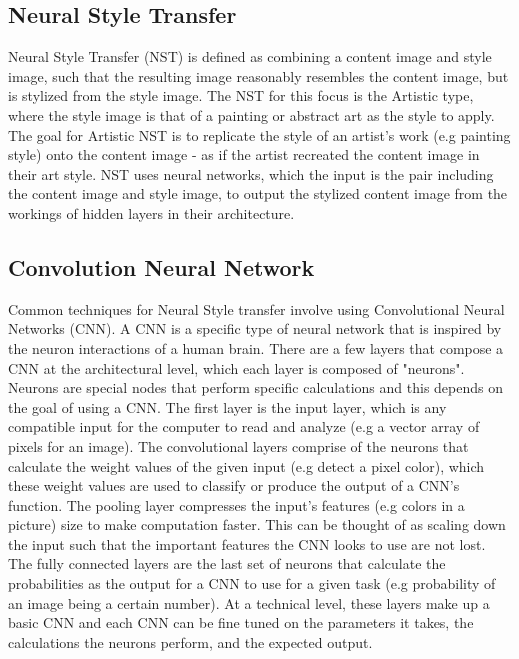 \documentclass[10pt,twocolumn]{article}
\begin{document}
\subsection{Neural Style Transfer}
Neural Style Transfer (NST) is defined as combining a content image and style image, such that the resulting image reasonably resembles the content image, but is stylized from the style image. \cite{li2018literature} The NST for this focus is the Artistic type, where the style image is that of a painting or abstract art as the style to apply. The goal for Artistic NST is to replicate the style of an artist's work (e.g painting style) onto the content image - as if the artist recreated the content image in their art style. NST uses neural networks, which the input is the pair including the content image and style image, to output the stylized content image from the workings of hidden layers in their architecture.\cite{youtube}

\subsection{Convolution Neural Network}
Common techniques for Neural Style transfer involve using Convolutional Neural Networks (CNN). A CNN is a specific type of neural network that is inspired by the neuron interactions of a human brain. There are a few layers that compose a CNN at the architectural level, which each layer is composed of "neurons". Neurons are special nodes that perform specific calculations and this depends on the goal of using a CNN. The first layer is the input layer, which is any compatible input for the computer to read and analyze (e.g a vector array of pixels for an image). The convolutional layers comprise of the neurons that calculate the weight values of the given input (e.g detect a pixel color), which these weight values are used to classify or produce the output of a CNN's function. The pooling layer compresses the input's features (e.g colors in a picture) size to make computation faster. This can be thought of as scaling down the input such that the important features the CNN looks to use are not lost. The fully connected layers are the last set of neurons that calculate the probabilities as the output for a CNN to use for a given task (e.g probability of an image being a certain number). At a technical level, these layers make up a basic CNN and each CNN can be fine tuned on the parameters it takes, the calculations the neurons perform, and the expected output.\cite{o2015introduction}
\end{document}

